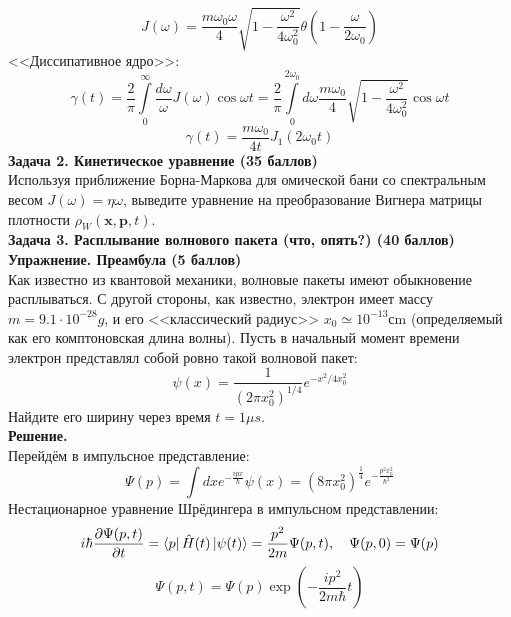\documentclass[12pt]{article}
\theoremstyle{definition}
\begin{document}
\begin{equation}
    \boxed{J(\omega)=\frac{m\omega_0\omega}{4}\sqrt{1-\frac{\omega^2}{4\omega^2_0}}\theta\left(1-\frac{\omega}{2\omega_0}\right)}
\end{equation}
<<Диссипативное ядро>>:
\begin{equation}
    \gamma(t)=\frac{2}{\pi}\int\limits_0^\infty\frac{d\omega}{\omega}J(\omega)\cos\omega t=\frac{2}{\pi}\int\limits_0^{2\omega_0}d\omega\frac{m\omega_0}{4}\sqrt{1-\frac{\omega^2}{4\omega^2_0}}\cos\omega t
\end{equation}
\begin{equation}
    \boxed{\gamma(t)=\frac{m\omega_0}{4t}J_1(2\omega_0t)}
\end{equation}
\textbf{Задача 2. Кинетическое уравнение (35 баллов)}\\
Используя приближение Борна-Маркова для омической бани со спектральным весом $J(\omega) = \eta\omega$, выведите уравнение на преобразование Вигнера матрицы плотности $\rho_W (\textbf{x}, \textbf{p}, t)$.\\
\textbf{Задача 3. Расплывание волнового пакета (что, опять?) (40 баллов)}\\
\textbf{Упражнение. Преамбула (5 баллов)}\\
Как известно из квантовой механики, волновые пакеты имеют обыкновение расплываться. С другой стороны, как известно, электрон имеет массу $m = 9.1\cdot 10^{-28}g$, и его <<классический радиус>> $x_0\simeq 10^{-13}\text{сm}$ (определяемый как его комптоновская длина волны). Пусть в начальный момент времени электрон представлял собой ровно такой волновой пакет:
\begin{equation}
    \psi(x) = \frac{1}{(2\pi x^2_0)^{1/4}}e^{-x^2/4x^2_0}
\end{equation}
Найдите его ширину через время $t = 1\mu s$.\\
\textbf{Решение.}\\
Перейдём в импульсное представление:
\begin{equation}
    \Psi(p)=\int dxe^{-\frac{ipx}{\hbar}}\psi(x)=(8\pi x^2_0)^\frac{1}{4}e^{-\frac{p^2x^2_0}{\hbar^2}}
\end{equation}
Нестационарное уравнение Шрёдингера в импульсном представлении:
\begin{equation}
    i\hbar\frac{\partial\Psi(p,t)}{\partial t}=\bra{p}\hat{H}(t)\ket{\psi(t)}=\frac{p^2}{2m}\Psi(p,t),\quad \Psi(p,0)=\Psi(p)
\end{equation}
\begin{equation}
    \Psi(p,t)=\Psi(p)\exp\left(-\frac{ip^2}{2m\hbar}t\right)
\end{equation}
\end{document}

